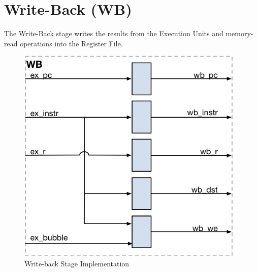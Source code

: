 \pagebreak


\section{Write-Back (WB)}\label{write-back-wb-1}

The Write-Back stage writes the results from the Execution Units and memory-read operations into the Register File.

\begin{figure}[h]
  \includegraphics{assets/img/Pipeline-WB}
  \caption{Write-back Stage Implementation}
\end{figure}

